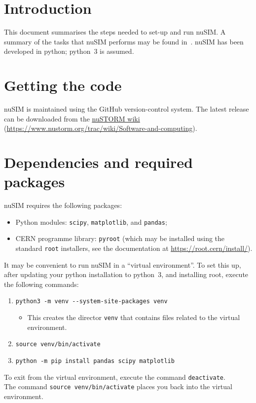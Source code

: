 \section*{Introduction}
This document summarises the steps needed to set-up and run nuSIM.
A summary of the tasks that nuSIM performs may be found
in~\cite{2021:nuSIM:Doc.01}.
nuSIM has been developed in python; python~3 is assumed.

\section*{Getting the code}
nuSIM is maintained using the GitHub version-control system.
The latest release can be downloaded from the
\href{https://www.nustorm.org}{\underline{\color{blue} nuSTORM wiki}}
(\href{https://www.nustorm.org/trac/wiki/Software-and-computing}{\underline{\color{blue}}https://www.nustorm.org/trac/wiki/Software-and-computing}).

\section*{Dependencies and required packages}
nuSIM requires the following packages:
\begin{itemize}
  \item Python modules: \verb+scipy+, \verb+matplotlib+, and
    \verb+pandas+;
  \item CERN programme library: \verb+pyroot+ (which may be installed
    using the standard \verb+root+ installers, see the documentation
    at \href{https://root.cern/install/}{\underline{\color{blue}https://root.cern/install/}}).
\end{itemize}
It may be convenient to run nuSIM in a ``virtual environment''.
To set this up, after updating your python installation to python~3,
and installing root, execute the following commands:
\begin{enumerate}
  \item \verb+python3 -m venv --system-site-packages venv+
    \begin{itemize}
      \item This creates the director \verb+venv+ that contains files
        related to the virtual environment.
    \end{itemize}
  \item \verb+source venv/bin/activate+
  \item \verb+python -m pip install pandas scipy matplotlib+
\end{enumerate}
To exit from the virtual environment, execute the command
\verb+deactivate+. \\
\noindent
The command \verb+source venv/bin/activate+ places you back
into the virtual environment.

